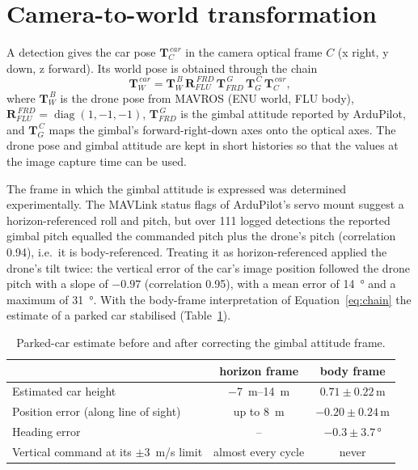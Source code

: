 \documentclass[11pt,a4paper]{report}
\begin{document}
\section{Camera-to-world transformation}
\label{sec:frames}

A detection gives the car pose $\mathbf{T}_{C}^{\,car}$ in the camera optical
frame $C$ (x right, y down, z forward). Its world pose is obtained through the
chain
\begin{equation}
  \mathbf{T}_{W}^{\,car} =
  \mathbf{T}_{W}^{\,B}\,\mathbf{R}_{FLU}^{\,FRD}\,
  \mathbf{T}_{FRD}^{\,G}\,\mathbf{T}_{G}^{\,C}\,\mathbf{T}_{C}^{\,car},
  \label{eq:chain}
\end{equation}
where $\mathbf{T}_{W}^{\,B}$ is the drone pose from MAVROS (ENU world, FLU body),
$\mathbf{R}_{FLU}^{\,FRD}=\operatorname{diag}(1,-1,-1)$,
$\mathbf{T}_{FRD}^{\,G}$ is the gimbal attitude reported by ArduPilot, and
$\mathbf{T}_{G}^{\,C}$ maps the gimbal's forward-right-down axes onto the
optical axes. The drone pose and gimbal attitude are kept in short histories so
that the values at the image capture time can be used.

The frame in which the gimbal attitude is expressed was determined
experimentally. The MAVLink status flags of ArduPilot's servo mount suggest a
horizon-referenced roll and pitch, but over 111 logged detections the reported
gimbal pitch equalled the commanded pitch plus the drone's pitch (correlation
0.94), i.e.\ it is body-referenced. Treating it as horizon-referenced applied the
drone's tilt twice: the vertical error of the car's image position followed the
drone pitch with a slope of $-0.97$ (correlation 0.95), with a mean error of
\SI{14}{\degree} and a maximum of \SI{31}{\degree}. With the body-frame
interpretation of Equation~\eqref{eq:chain} the estimate of a parked car stabilised
(Table~\ref{tab:gimbal-frame}).

\begin{table}[htbp]
  \centering
  \caption{Parked-car estimate before and after correcting the gimbal attitude frame.}
  \label{tab:gimbal-frame}
  \begin{tabular}{@{}lcc@{}}
    \toprule
     & horizon frame & body frame \\
    \midrule
    Estimated car height & \SIrange{-7}{14}{m} & $0.71\pm0.22$\,m \\
    Position error (along line of sight) & up to \SI{8}{m} & $-0.20\pm0.24$\,m \\
    Heading error & -- & $-0.3\pm3.7$\,\si{\degree} \\
    Vertical command at its $\pm$\SI{3}{m/s} limit & almost every cycle & never \\
    \bottomrule
  \end{tabular}
\end{table}
\end{document}
